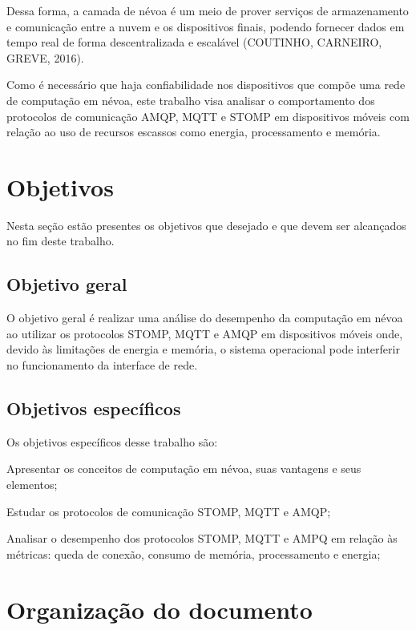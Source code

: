 Dessa forma, a camada de névoa é um meio de prover serviços de armazenamento e comunicação entre a nuvem e os dispositivos finais, podendo fornecer dados em tempo real de forma descentralizada e escalável (COUTINHO, CARNEIRO, GREVE, 2016). 

Como é necessário que haja confiabilidade nos dispositivos que compõe uma rede de computação em névoa, este trabalho visa analisar o comportamento dos protocolos de comunicação AMQP, MQTT e STOMP em dispositivos móveis com relação ao uso de recursos escassos como energia, processamento e memória. 

\section{\textbf{Objetivos}}

Nesta seção estão presentes os objetivos que desejado e que devem ser alcançados no fim deste trabalho.

\subsection{\textbf{Objetivo geral}}

O objetivo geral é realizar uma análise do desempenho da computação em névoa ao utilizar os protocolos STOMP, MQTT e AMQP em dispositivos móveis onde, devido às limitações de energia e memória, o sistema operacional pode interferir no funcionamento da interface de rede.

\subsection{\textbf{Objetivos específicos}}

\noindent Os objetivos específicos desse trabalho são:

\begin{compactitem}
\item Apresentar os conceitos de computação em névoa, suas vantagens e seus elementos; 
\item Estudar os protocolos de comunicação STOMP, MQTT e AMQP; 
\item Analisar o desempenho dos protocolos STOMP, MQTT e AMPQ em relação às métricas: queda de conexão, consumo de memória, processamento e energia;
\end{compactitem}

\section{\textbf{Organização do documento}}
